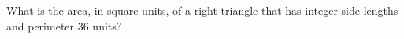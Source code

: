 What is the area, in square units, of a right triangle that has integer side lengths and perimeter $36$ units?
